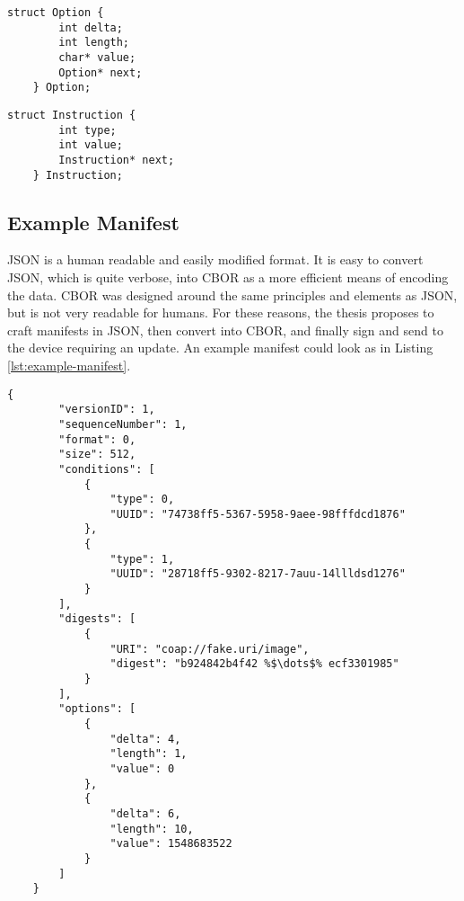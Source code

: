 \documentclass[0-thesis.tex]{subfiles}
\begin{document}
\begin{lstlisting}[language=blockc,
                    caption={The format of the option field.}, 
                    label={lst:option-struct}]
    struct Option {
        int delta;
        int length;
        char* value;
        Option* next;
    } Option;
\end{lstlisting}

\begin{lstlisting}[language=blockc,
                    caption={The format of directives or processing steps.}, 
                    label={lst:instruction}]
    struct Instruction {
        int type;
        int value;
        Instruction* next;
    } Instruction;
\end{lstlisting}

\subsection{Example Manifest}
\label{ssec:example-manifest}
JSON is a human readable and easily modified format. It is easy to convert JSON, which is
quite verbose, into CBOR as a more efficient means of encoding the data. CBOR was designed
around the same principles and elements as JSON, but is not very readable for humans. For
these reasons, the thesis proposes to craft manifests in JSON, then convert into CBOR, and
finally sign and send to the device requiring an update. An example manifest could look as
in Listing \ref{lst:example-manifest}.

\begin{lstlisting}[language=blockjson,
                    caption={An example manifest.},
                    label={lst:example-manifest},
                    escapechar=\%]
    {
        "versionID": 1,
        "sequenceNumber": 1,
        "format": 0,
        "size": 512,
        "conditions": [
            {
                "type": 0,
                "UUID": "74738ff5-5367-5958-9aee-98fffdcd1876"
            },
            {
                "type": 1,
                "UUID": "28718ff5-9302-8217-7auu-14llldsd1276"
            }
        ],
        "digests": [
            {
                "URI": "coap://fake.uri/image",
                "digest": "b924842b4f42 %$\dots$% ecf3301985"
            }
        ],
        "options": [
            {
                "delta": 4,
                "length": 1,
                "value": 0
            },
            {
                "delta": 6,
                "length": 10,
                "value": 1548683522
            }
        ]
    }
\end{lstlisting}
\end{document}
